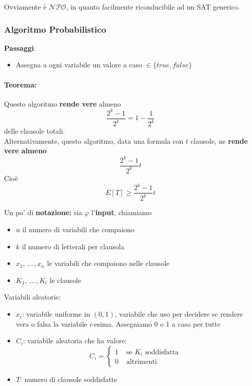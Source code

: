 Ovviamente è $\mathcal{NPO}$, in quanto facilmente riconducibile ad un SAT generico.\\


\subsubsection{Algoritmo Probabilistico}

\textbf{Passaggi}: 
\begin{itemize}
	\item Assegna a ogni variabile un valore a caso $\in \{true, false\}$
\end{itemize}

\paragraph{Teorema:} Questo algoritmo \textbf{rende vere} almeno 
$$ \frac{2^k-1}{2^k} = 1 - \frac{1}{2^k} $$
delle clausole totali.\\

Alternativamente, questo algoritmo, data una formula con $t$ clausole, ne \textbf{rende vere almeno}
$$ \frac{2^k-1}{2^k} t $$
Cioè 
$$ E[T] \geq  \frac{2^k-1}{2^k} t  $$

Un po' di \textbf{notazione:} sia $\varphi$ l'\textbf{input}, chiamiamo 
\begin{itemize}
	\item $n$ il numero di variabili che compaiono
	\item $k$ il numero di letterali per clausola 
	\item $x_1, \, \dots \, , x_n$ le variabili che compaiono nelle clausole
	\item $K_1, \, \dots \, , K_t$ le clausole
\end{itemize}

Variabili aleatorie: 
\begin{itemize}
	\item $x_i$: variabile uniforme in $(0,1)$, variabile che uso per decidere se rendere vera o falsa la variabile $i$-esima. Assegniamo 0 o 1 a caso per tutte
	\item $C_i$: variabile aleatoria che ha valore:
	$$ C_i = \begin{cases}
		1 & \text{ se } K_i \text{ soddisfatta } \\
		0 &  \text{ altrimenti }
	\end{cases}
	$$
	\item $T$: numero di clausole soddisfatte
\end{itemize}

